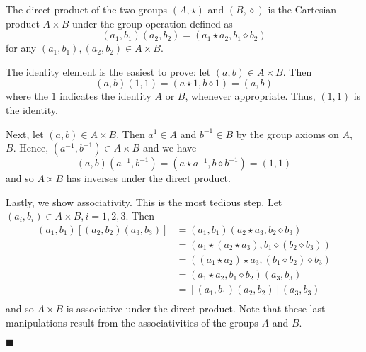 \documentclass[12pt]{article}
\renewcommand{\qed}{\hfill$\blacksquare$}
\renewenvironment{proof}{\begin{addmargin}[1em]{0em}\begin{newproof}}{\end{newproof}\end{addmargin}\qed}
\begin{document}
\begin{proof}
The direct product of the two groups $\left(A,\star\right)$ and $\left(B,\diamond \right)$ is the Cartesian product $A\times B$ under the group operation defined as
$$\left(a_1,b_1\right)\left(a_2,b_2\right) = \left(a_1\star a_2, b_1\diamond b_2\right) $$
for any $\left(a_1,b_1\right),\left(a_2,b_2\right)\in A\times B$.

The identity element is the easiest to prove: let $\left(a,b\right)\in A\times B$. Then
$$ \left(a,b\right)\left(1,1\right) = \left(a\star 1, b\diamond 1\right) = \left(a,b\right) $$
where the $1$ indicates the identity $A$ or $B$, whenever appropriate. Thus, $\left(1,1\right)$ is the identity.

Next, let $\left(a,b\right)\in A\times B$. Then $a^{1}\in A$ and $b^{-1}\in B$ by the group axioms on $A$, $B$. Hence, $\left(a^{-1},b^{-1}\right)\in A\times B$ and we have
$$ \left(a,b\right)\left(a^{-1},b^{-1}\right) = \left(a\star a^{-1},b\diamond b^{-1}\right) = \left(1,1\right) $$
and so $A\times B$ has inverses under the direct product.

Lastly, we show associativity. This is the most tedious step. Let $\left(a_i,b_i\right)\in A\times B, i=1,2,3$. Then
\begin{equation*}
    \begin{split}
        \left(a_1,b_1\right)\left[\left(a_2,b_2\right)\left(a_3,b_3\right)\right] & = \left(a_1,b_1\right)\left(a_2\star a_3, b_2\diamond b_3\right) \\
        & = \left(a_1 \star \left(a_2\star a_3\right), b_1 \diamond \left(b_2 \diamond b_3\right)\right) \\
        & = \left(\left( a_1 \star a_2\right) \star a_3, \left(b_1 \diamond b_2 \right) \diamond b_3\right) \\
        & = \left(a_1 \star a_2, b_1 \diamond b_2\right)\left(a_3,b_3\right)\\
        & = \left[\left(a_1,b_1\right)\left(a_2,b_2\right) \right]\left(a_3,b_3\right) \\
    \end{split}
\end{equation*}
and so $A\times B$ is associative under the direct product. Note that these last manipulations result from the associativities of the groups $A$ and $B$.
\end{proof}
\end{document}
